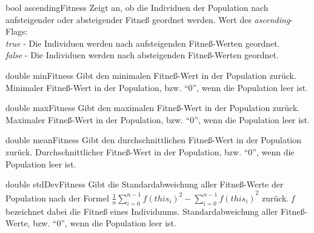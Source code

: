 \documentclass{report}
\begin{document}
\newpage

\setNormalInstance
\printEmptyMethodReturn
{bool}
{ascendingFitness}
{Zeigt an, ob die Individuen der Population nach aufsteigender oder
    absteigender Fitne{\ss} geordnet werden.}
{Wert des {\em ascending}-Flags:\\
 {\em true} - Die Individuen werden nach aufsteigenden
                              Fitne{\ss}-Werten geordnet.\\
                    {\em false} - Die Individuen werden nach absteigenden
                              Fitne{\ss}-Werten geordnet.}

\vspace{4ex}

\setConstInstance
\printEmptyMethodReturn
{double}
{minFitness}
{Gibt den minimalen Fitne{\ss}-Wert in der Population zur\"uck.}
{Minimaler Fitne{\ss}-Wert in der Population, bzw. ``0'', wenn
                    die Population leer ist.}

\vspace{4ex}

\setConstInstance
\printEmptyMethodReturn
{double}
{maxFitness}
{Gibt den maximalen Fitne{\ss}-Wert in der Population zur\"uck.}
{Maximaler Fitne{\ss}-Wert in der Population, bzw. ``0'', wenn
                    die Population leer ist.}

\vspace{4ex}

\setConstInstance
\printEmptyMethodReturn
{double}
{meanFitness}
{Gibt den durchschnittlichen Fitne{\ss}-Wert in der Population zur\"uck.}
{Durchschnittlicher Fitne{\ss}-Wert in der Population, bzw.
                    ``0'', wenn die Population leer ist.}

\vspace{4ex}

\setConstInstance
\printEmptyMethodReturn
{double}
{stdDevFitness}
{Gibt die Standardabweichung aller Fitne{\ss}-Werte der Population 
 nach der Formel $\frac{1}{n}\sum_{i=0}^{n-1}{f(this_i)}^2 - 
 {\sum_{i=0}^{n-1}f(this_i)}^2$ zur\"uck. {\em f} bezeichnet dabei
 die Fitne{\ss} eines Individuums.
}
{Standardabweichung aller Fitne{\ss}-Werte, bzw. ``0'', wenn die Population
 leer ist.}
\end{document}
